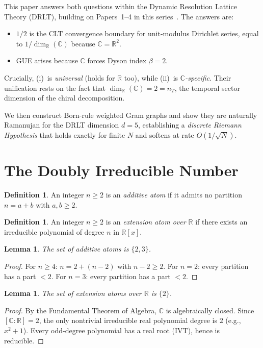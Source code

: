 \documentclass[12pt]{article}
\newtheorem{lemma}[theorem]{Lemma}
\theoremstyle{definition}
\newtheorem{definition}[theorem]{Definition}
\theoremstyle{remark}
\newcommand{\CC}{\mathbb{C}}
\newcommand{\RR}{\mathbb{R}}
\begin{document}
This paper answers both questions within the Dynamic Resolution
Lattice Theory (DRLT), building on Papers~1--4 in this
series~\cite{Paper1,Paper2,Paper3,Paper4}.
The answers are:
\begin{itemize}
\item[(i)] $1/2$ is the CLT convergence boundary for
  unit-modulus Dirichlet series, equal to $1/\dim_\RR(\CC)$
  because $\CC = \RR^2$.
\item[(ii)] GUE arises because $\CC$ forces Dyson index $\beta = 2$.
\end{itemize}
Crucially, (i)~is \emph{universal} (holds for $\RR$ too),
while (ii)~is \emph{$\CC$-specific}.
Their unification rests on the fact that $\dim_\RR(\CC) = 2 = n_T$,
the temporal sector dimension of the chiral decomposition.

We then construct Born-rule weighted Gram graphs and show they
are naturally Ramanujan for the DRLT dimension $d = 5$,
establishing a \emph{discrete Riemann Hypothesis} that holds
exactly for finite $N$ and softens at rate $O(1/\sqrt{N})$.

\section{The Doubly Irreducible Number}
\label{sec:doubly}

\begin{definition}
An integer $n \geq 2$ is an \emph{additive atom} if it admits
no partition $n = a + b$ with $a, b \geq 2$.
\end{definition}

\begin{definition}
An integer $n \geq 2$ is an \emph{extension atom over $\RR$} if
there exists an irreducible polynomial of degree $n$ in $\RR[x]$.
\end{definition}

\begin{lemma}\label{lem:add}
The set of additive atoms is $\{2, 3\}$.
\end{lemma}
\begin{proof}
For $n \geq 4$: $n = 2 + (n-2)$ with $n-2 \geq 2$.
For $n = 2$: every partition has a part $< 2$.
For $n = 3$: every partition has a part $< 2$.
\end{proof}

\begin{lemma}\label{lem:ext}
The set of extension atoms over $\RR$ is $\{2\}$.
\end{lemma}
\begin{proof}
By the Fundamental Theorem of Algebra, $\CC$ is algebraically
closed. Since $[\CC:\RR] = 2$, the only nontrivial irreducible
real polynomial degree is $2$ (e.g., $x^2 + 1$).
Every odd-degree polynomial has a real root (IVT), hence is
reducible.
\end{proof}
\end{document}
